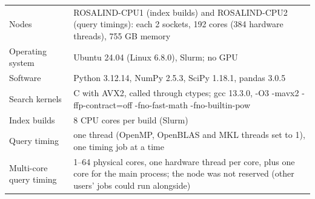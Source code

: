 \begin{tabular}{lp{}}
\toprule
 &  \\
\midrule
Nodes & ROSALIND-CPU1 (index builds) and ROSALIND-CPU2 (query timings): each 2 sockets, 192 cores (384 hardware threads), 755 GB memory \\
Operating system & Ubuntu 24.04 (Linux 6.8.0), Slurm; no GPU \\
Software & Python 3.12.14, NumPy 2.5.3, SciPy 1.18.1, pandas 3.0.5 \\
Search kernels & C with AVX2, called through ctypes; gcc 13.3.0, -O3 -mavx2 -ffp-contract=off -fno-fast-math -fno-builtin-pow \\
Index builds & 8 CPU cores per build (Slurm) \\
Query timing & one thread (OpenMP, OpenBLAS and MKL threads set to 1), one timing job at a time \\
Multi-core query timing & 1--64 physical cores, one hardware thread per core, plus one core for the main process; the node was not reserved (other users' jobs could run alongside) \\
\bottomrule
\end{tabular}
